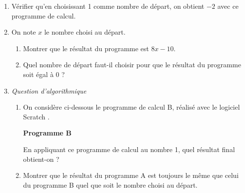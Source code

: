 \documentclass[exercice,a4]{thedocument}%
\begin{document}
\begin{enumerate}
	\item Vérifier qu'en choisissant 1 comme nombre de départ, on obtient $-2$ avec ce programme de calcul.

	\item On note $x$ le nombre choisi au départ.
	\begin{enumerate}
		\item Montrer que le résultat du programme est $8x - 10$.

		\item Quel nombre de départ faut-il choisir pour que le résultat du programme soit égal à 0 ?
	\end{enumerate}

	\item \emph{Question d'algorithmique}
	\begin{enumerate}
		\item On considère ci-dessous le programme de calcul B, réalisé avec le logiciel \og Scratch \fg.

		\begin{center}
				\centering \textbf{Programme B}\\[6pt]

				\begin{scratch}
				\end{scratch}
		\end{center}

		En appliquant ce programme de calcul au nombre 1, quel résultat final obtient-on ?

		\item Montrer que le résultat du programme A est toujours le même que celui du programme B quel que soit le nombre choisi au départ.
	\end{enumerate}
\end{enumerate}

\medskip
\showthesource
\end{document}
